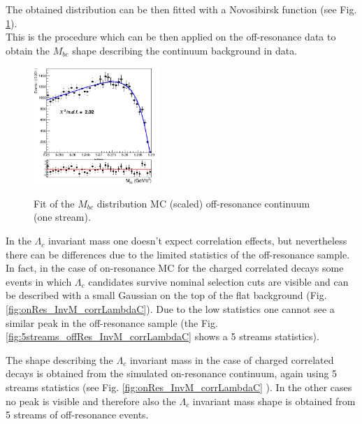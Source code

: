 \noindent  The obtained distribution can be then fitted with a Novosibirsk function (see Fig. \ref{fig:charged_corrLambdaC_Mbc_continuumMC_fit}). \\
This is the procedure which can be then applied on the off-resonance data to obtain the $M_{bc}$ shape describing the continuum background in data.
\begin{figure}
\centering
{\includegraphics[width=0.43\textwidth]{04-SimultaneousFit/figs/stream5_rescaledMbc_40binsHist.png}}
\caption{Fit of the $M_{bc}$ distribution   MC (scaled) off-resonance continuum (one stream).}
\label{fig:charged_corrLambdaC_Mbc_continuumMC_fit}
\end{figure}

In the $\Lambda_c$ invariant mass one doesn't expect correlation effects, but nevertheless there can be differences due to the limited statistics of the off-resonance sample. 
In fact, in the case of on-resonance MC for the charged correlated decays some events in which  $\Lambda_c$ candidates survive nominal selection cuts are visible and can be described with a small Gaussian on the top of the flat background (Fig.\ref{fig:onRes_InvM_corrLambdaC}). Due to the low statistics one cannot see a similar peak in the off-resonance sample (the Fig.\ref{fig:5streams_offRes_InvM_corrLambdaC} shows a 5 streams statistics).

The shape describing the $\Lambda_c$ invariant mass in the case of charged correlated decays is obtained from the simulated on-resonance continuum, again using 5 streams statistics (see Fig. \ref{fig:onRes_InvM_corrLambdaC} ). In the other cases no peak is visible and therefore also the $\Lambda_c$ invariant mass shape is obtained from 5 streams of off-resonance events.


